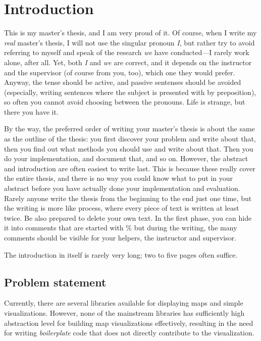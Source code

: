 \chapter{Introduction}
\label{chapter:intro}

This is my master's thesis, and I am very proud of it.  Of course,
when I write my \emph{real} master's thesis, I will not use the
singular pronoun \emph{I}, but rather try to avoid referring to myself
and speak of the research \emph{we} have conducted---I rarely work
alone, after all.  Yet, both \emph{I} and \emph{we} are correct, and
it depends on the instructor and the supervisor (of course from you,
too), which one they would prefer. Anyway, the tense should be active,
and passive sentenses should be avoided (especially, writing sentences
where the subject is presented with by preposition), so often you
cannot avoid choosing between the pronouns. Life is strange, but there
you have it.

By the way, the preferred order of writing your master's thesis is
about the same as the outline of the thesis: you first discover your
problem and write about that, then you find out what methods you
should use and write about that.  Then you do your implementation, and
document that, and so on.  However, the abstract and introduction are
often easiest to write last.  This is because these really cover the
entire thesis, and there is no way you could know what to put in your
abstract before you have actually done your implementation and
evaluation. Rarely anyone write the thesis from the beginning to the
end just one time, but the writing is more like process, where every
piece of text is written at least twice. Be also prepared to delete
your own text. In the first phase, you can hide it into comments that
are started with \% but during the writing, the many comments should be
visible for your helpers, the instructor and supervisor.

The introduction in itself is rarely very long; two to five pages often
suffice.


\section{Problem statement}

Currently, there are several libraries available for displaying maps and simple visualizations. However, none of the mainstream libraries has sufficiently high abstraction level for building map visualizations effectively, resulting in the need for writing \emph{boilerplate} code that does not directly contribute to the visualization.

